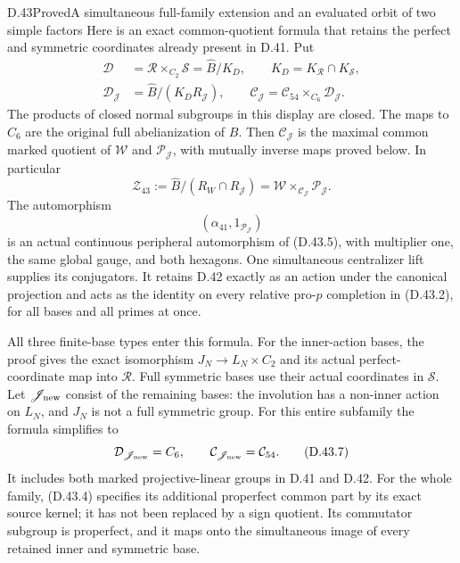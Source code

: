 \begin{statement}{D.43}{Proved}{A simultaneous full-family extension and an evaluated orbit of two simple factors}
Here is an exact common-quotient formula that
retains the perfect and symmetric coordinates
already present in D.41. Put
\[
 \begin{split}
 \mathcal D&=\mathcal R\times_{C_2}\mathcal S
                    =\widehat B/K_D,\qquad
 K_D=K_{\mathcal R}\cap K_{\mathcal S},\\
 \mathcal D_{\mathscr J}
    &=\widehat B/(K_D R_{\mathscr J}),\qquad
 \mathcal C_{\mathscr J}
    =\mathcal C_{54}\times_{C_6}\mathcal D_{\mathscr J}.
 \end{split}                                                   \tag{D.43.4}
\]
The products of closed normal subgroups in this
display are closed. The maps to $C_6$ are the
original full abelianization of $B$.
Then $\mathcal C_{\mathscr J}$ is the maximal
common marked quotient of $\mathcal W$ and
$\mathcal P_{\mathscr J}$, with mutually inverse
maps proved below. In particular
\[
 \mathcal Z_{43}
   :=\widehat B/(R_W\cap R_{\mathscr J})
    =\mathcal W\times_{\mathcal C_{\mathscr J}}
                                \mathcal P_{\mathscr J}.        \tag{D.43.5}
\]
The automorphism
\[
       (\alpha_{41},1_{\mathcal P_{\mathscr J}})                 \tag{D.43.6}
\]
is an actual continuous peripheral automorphism
of (D.43.5), with multiplier one, the same
global gauge, and both hexagons. One simultaneous
centralizer lift supplies its conjugators.
It retains D.42 exactly as an action under the
canonical projection and acts as the identity
on every relative pro-$p$ completion in
(D.43.2), for all bases and all primes at once.

All three finite-base types enter this formula.
For the inner-action bases, the proof gives
the exact isomorphism $J_N\to L_N\times C_2$
and its actual perfect-coordinate map into
$\mathcal R$. Full symmetric bases use their
actual coordinates in $\mathcal S$. Let
$\mathscr J_{\rm new}$ consist of the remaining
bases: the involution has a non-inner action
on $L_N$, and $J_N$ is not a full symmetric
group. For this entire subfamily the formula
simplifies to
\[
 \mathcal D_{\mathscr J_{\rm new}}=C_6,\qquad
 \mathcal C_{\mathscr J_{\rm new}}=\mathcal C_{54}.
                                                               \tag{D.43.7}
\]
It includes both marked projective-linear
groups in D.41 and D.42. For the whole
family, (D.43.4) specifies its additional
properfect common part by its exact source
kernel; it has not been replaced by a
sign quotient. Its commutator subgroup is
properfect, and it maps onto the simultaneous
image of every retained inner and symmetric
base.


\end{statement}
